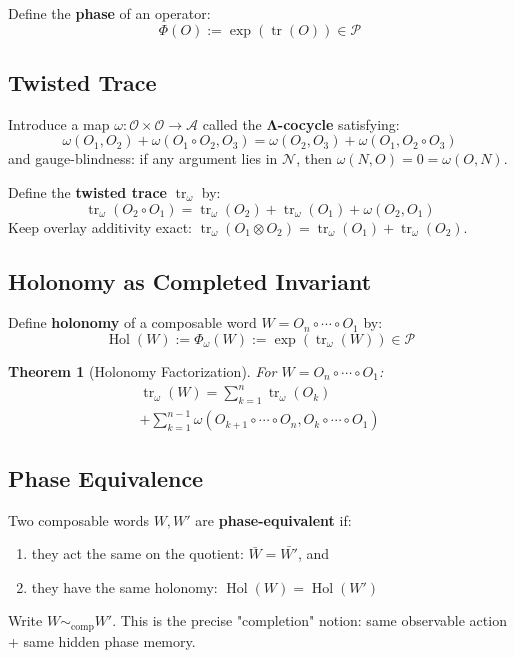 \documentclass[12pt, oneside]{article}
\newtheorem{theorem}{Theorem}[section]
\DeclareMathOperator{\tr}{tr}
\DeclareMathOperator{\Hol}{Hol}
\newcommand{\N}{\mathcal{N}}
\newcommand{\A}{\mathcal{A}}
\newcommand{\Opr}{\mathcal{O}}
\begin{document}
Define the \textbf{phase} of an operator:
\begin{equation}
\Phi(O) := \exp(\tr(O)) \in \mathcal{P}
\end{equation}

\subsection{Twisted Trace}

Introduce a map $\omega: \Opr \times \Opr \rightarrow \A$ called the \textbf{Λ-cocycle} satisfying:
\begin{equation}
\omega(O_1, O_2) + \omega(O_1 \circ O_2, O_3) = \omega(O_2, O_3) + \omega(O_1, O_2 \circ O_3)
\end{equation}
and gauge-blindness: if any argument lies in $\N$, then $\omega(N, O) = 0 = \omega(O, N)$.

Define the \textbf{twisted trace} $\tr_\omega$ by:
\begin{equation}
\tr_\omega(O_2 \circ O_1) = \tr_\omega(O_2) + \tr_\omega(O_1) + \omega(O_2, O_1)
\end{equation}
Keep overlay additivity exact: $\tr_\omega(O_1 \otimes O_2) = \tr_\omega(O_1) + \tr_\omega(O_2)$.

\subsection{Holonomy as Completed Invariant}

Define \textbf{holonomy} of a composable word $W = O_n \circ \cdots \circ O_1$ by:
\begin{equation}
\Hol(W) := \Phi_\omega(W) := \exp(\tr_\omega(W)) \in \mathcal{P}
\end{equation}

\begin{theorem}[Holonomy Factorization]
For $W = O_n \circ \cdots \circ O_1$:
\begin{multline}
\tr_\omega(W) = \sum_{k=1}^n \tr_\omega(O_k) \\
+ \sum_{k=1}^{n-1} \omega(O_{k+1} \circ \cdots \circ O_n, O_k \circ \cdots \circ O_1)
\end{multline}
\end{theorem}

\subsection{Phase Equivalence}

Two composable words $W, W'$ are \textbf{phase-equivalent} if:
\begin{enumerate}
    \item they act the same on the quotient: $\bar{W} = \bar{W'}$, and
    \item they have the same holonomy: $\Hol(W) = \Hol(W')$
\end{enumerate}
Write $W \sim_{\text{comp}} W'$. This is the precise "completion" notion: same observable action + same hidden phase memory.
\end{document}
